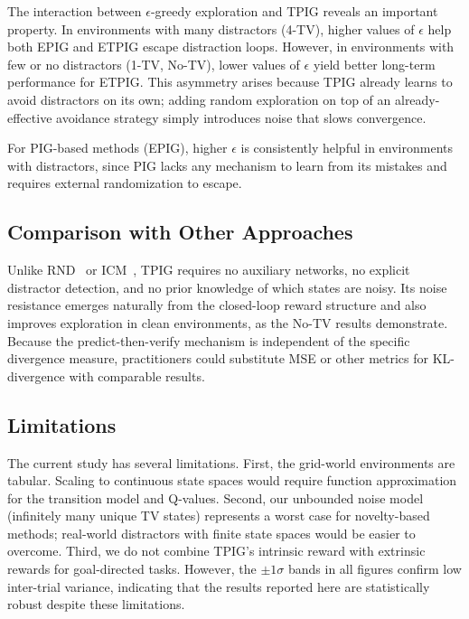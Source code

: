 \documentclass[letterpaper]{article}
\begin{document}
The interaction between $\epsilon$-greedy exploration and TPIG
reveals an important property.  In environments with many distractors
(4-TV), higher values of $\epsilon$ help both EPIG and ETPIG escape
distraction loops.  However, in environments with few or no
distractors (1-TV, No-TV), lower values of $\epsilon$ yield better
long-term performance for ETPIG.  This asymmetry arises because TPIG
already learns to avoid distractors on its own; adding random
exploration on top of an already-effective avoidance strategy simply
introduces noise that slows convergence.

For PIG-based methods (EPIG), higher $\epsilon$ is consistently
helpful in environments with distractors, since PIG lacks any
mechanism to learn from its mistakes and requires external
randomization to escape.

\subsection{Comparison with Other Approaches}

Unlike RND~\cite{Burda2019RND} or ICM~\cite{Pathak2017ICM}, TPIG
requires no auxiliary networks, no explicit distractor detection, and
no prior knowledge of which states are noisy.  Its noise resistance
emerges naturally from the closed-loop reward structure and also
improves exploration in clean environments, as the No-TV results
demonstrate.  Because the predict-then-verify mechanism is independent
of the specific divergence measure, practitioners could substitute
MSE or other metrics for KL-divergence with comparable results.

\subsection{Limitations}

The current study has several limitations.  First, the grid-world
environments are tabular.  Scaling to continuous state spaces would
require function approximation for the transition model and Q-values.
Second, our unbounded noise model (infinitely many unique TV states)
represents a worst case for novelty-based methods; real-world
distractors with finite state spaces would be easier to overcome.
Third, we do not combine TPIG's intrinsic reward with extrinsic
rewards for goal-directed tasks.
However, the $\pm 1\sigma$ bands in all figures confirm low
inter-trial variance, indicating that the results reported here
are statistically robust despite these limitations.
\end{document}
